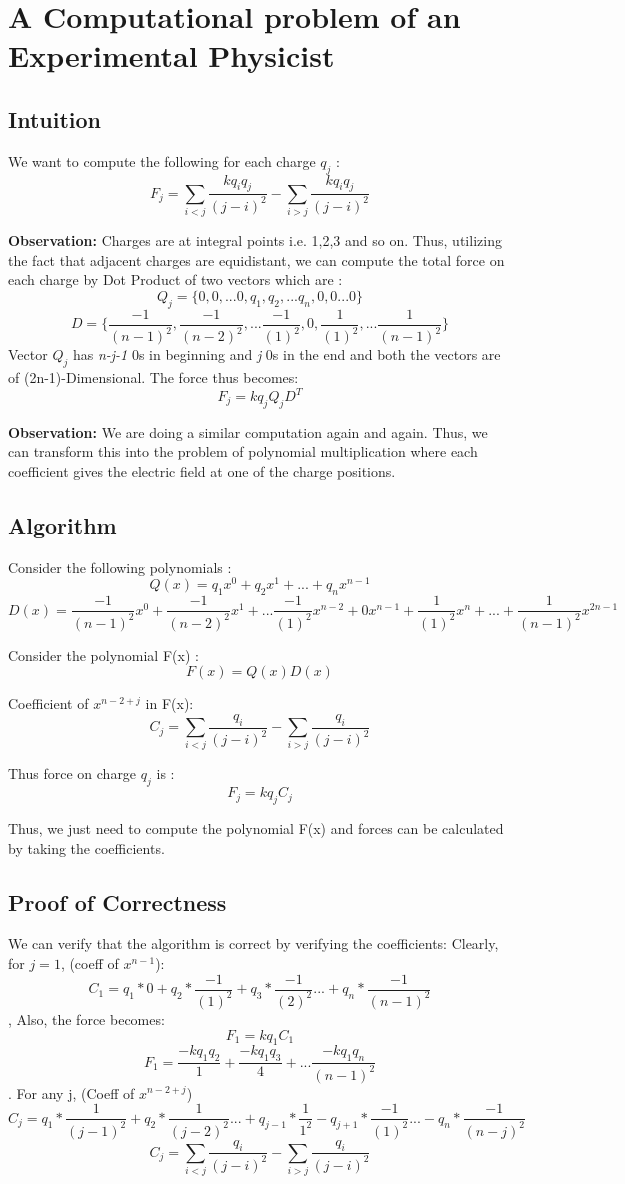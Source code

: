\documentclass{article}
\begin{document}
\section{A Computational problem of an Experimental Physicist }

\subsection{Intuition}

We want to compute the following for each charge $q_j$ :
$$ F_j = \sum_{i<j}\frac{kq_iq_j}{(j-i)^{2}} - \sum_{i>j}\frac{kq_iq_j}{(j-i)^{2}}$$

\textbf{Observation: } Charges are at integral points i.e. 1,2,3 and so on. Thus, utilizing the fact that adjacent charges are equidistant, we can compute the total force on each charge by Dot Product of two vectors which are :
$$Q_j = \{0,0, ... 0, q_1,q_2, ... q_n,0,0 ... 0\}$$
$$D = \{ \frac{-1}{(n-1)^2},\frac{-1}{(n-2)^2},... \frac{-1}{(1)^2},0, \frac{1}{(1)^2},... \frac{1}{(n-1)^2}\}$$
Vector $Q_j$ has \textit{n-j-1} 0s in beginning and \textit{j} 0s in the end and both the vectors are of (2n-1)-Dimensional. The force thus becomes:
$$F_j= kq_jQ_jD^{T}$$

\textbf{Observation: }We are doing a similar computation again and again. Thus, we can transform this into the problem of polynomial multiplication where each coefficient gives the electric field at one of the charge positions.

\subsection{Algorithm}

Consider the following polynomials :
$$Q(x) = q_1x^0 + q_2x^1 + ... + q_nx^{n-1}$$
$$D(x) = \frac{-1}{(n-1)^2}x^0 + \frac{-1}{(n-2)^2}x^1 + ... \frac{-1}{(1)^2}x^{n-2} +0x^{n-1}+ \frac{1}{(1)^2}x^{n}+...+ \frac{1}{(n-1)^2}x^{2n-1}$$

Consider the polynomial F(x) :
$$F(x) = Q(x)D(x)$$

Coefficient of $x^{n-2+j}$ in F(x): 
$$ C_j = \sum_{i<j}\frac{q_i}{(j-i)^{2}} - \sum_{i>j}\frac{q_i}{(j-i)^{2}}$$ 

Thus force on charge $q_j$ is :
$$F_j =  kq_jC_j$$

Thus, we just need to compute the polynomial F(x) and forces can be calculated by taking the coefficients.
\subsection{Proof of Correctness}
We can verify that the algorithm is correct by verifying the coefficients:
Clearly, for $j=1$, (coeff of $x^{n-1}$):
$$C_1 = q_1*0+ q_2*\frac{-1}{(1)^2} + q_3*\frac{-1}{(2)^2}... + q_n*\frac{-1}{(n-1)^2}$$, Also, the force becomes: 
$$F_1 = kq_1C_1$$
$$F_1 = \frac{-kq_1q_2}{1} + \frac{-kq_1q_3}{4}+ ... \frac{-kq_1q_n}{(n-1)^2}$$.
For any j, (Coeff of $x^{n-2+j}$)
$$C_j = q_1*\frac{1}{(j-1)^2} +q_2*\frac{1}{(j-2)^2} ...+ q_{j-1}*\frac{1}{1^2} - q_{j+1}*\frac{-1}{(1)^2}... - q_n*\frac{-1}{(n-j)^2}  $$
$$ C_j = \sum_{i<j}\frac{q_i}{(j-i)^{2}} - \sum_{i>j}\frac{q_i}{(j-i)^{2}}$$ 
\end{document}
